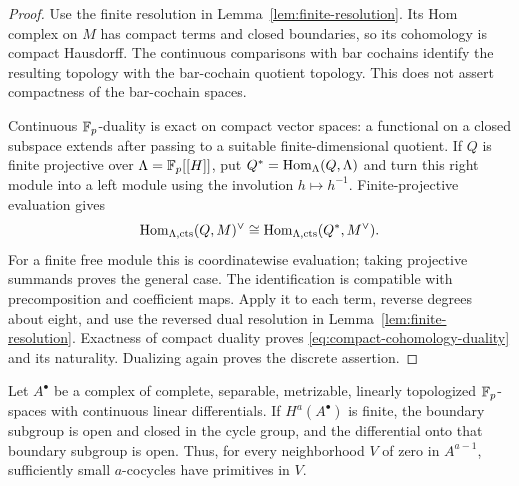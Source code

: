 \begin{proof}
Use the finite resolution in Lemma~\ref{lem:finite-resolution}.
Its Hom complex on $M$ has compact terms and closed boundaries, so its
cohomology is compact Hausdorff.  The continuous comparisons with bar
cochains identify the resulting topology with the bar-cochain quotient
topology.  This does not assert compactness of the bar-cochain spaces.

Continuous $\mathbb F_p$-duality is exact on compact vector spaces: a
functional on a closed subspace extends after passing to a suitable
finite-dimensional quotient.  If $Q$ is finite projective over
$\Lambda=\mathbb F_p[[H]]$, put $Q^*=\operatorname{Hom}_\Lambda(Q,\Lambda)$ and turn this
right module into a left module using the involution $h\mapsto h^{-1}$.
Finite-projective evaluation gives
\[
 \operatorname{Hom}_{\Lambda,\mathrm{cts}}(Q,M)^\vee
 \cong \operatorname{Hom}_{\Lambda,\mathrm{cts}}(Q^*,M^\vee).
\]
For a finite free module this is coordinatewise evaluation; taking
projective summands proves the general case.  The identification is
compatible with precomposition and coefficient maps.  Apply it to
each term, reverse degrees about eight, and use the reversed dual
resolution in Lemma~\ref{lem:finite-resolution}.  Exactness of compact
duality proves \eqref{eq:compact-cohomology-duality} and its naturality.
Dualizing again proves the discrete assertion.
\end{proof}

\begin{lemma}[Strictness]
\label{lem:strictness}
Let $A^\bullet$ be a complex of complete, separable, metrizable,
linearly topologized $\mathbb F_p$-spaces with continuous linear differentials.
If $H^a(A^\bullet)$ is finite, the boundary subgroup is
open and closed in the cycle group, and the differential onto that
boundary subgroup is open.  Thus, for every neighborhood $V$ of zero
in $A^{a-1}$, sufficiently small $a$-cocycles have primitives in $V$.
\end{lemma}

